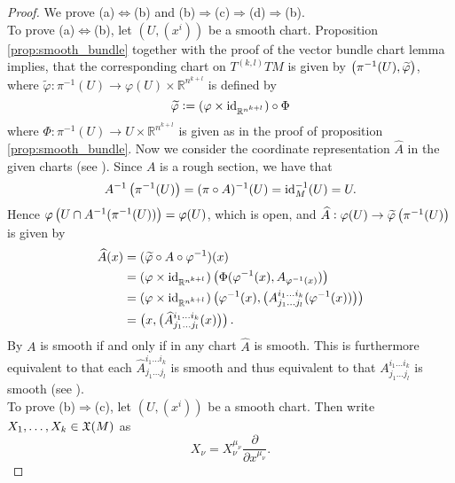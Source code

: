 \begin{appendix}
\begin{proof}
We prove (a)$\Leftrightarrow$(b) and (b)$\Rightarrow$(c)$\Rightarrow$(d)$\Rightarrow$(b).\\
To prove (a)$\Leftrightarrow$(b), let $(U,(x^i))$ be a smooth chart. Proposition \ref{prop:smooth_bundle} together with the proof of the vector bundle chart lemma \cite[253--254]{lee:smooth_manifolds:2013} implies, that the corresponding chart on $T^{(k,l)}TM$ is given by $\del[1]{\pi^{-1}(U),\widetilde{\varphi}}$, where $\widetilde{\varphi}: \pi^{-1}(U) \to \varphi(U) \times \mathbb{R}^{n^{k+l}}$ is defined by
\begin{equation*}
\widetilde{\varphi} := (\varphi \times \operatorname{id}_{\mathbb{R}^{n^{k+l}}}) \circ \Phi
\end{equation*}
\noindent where $\Phi : \pi^{-1}(U) \to U \times \mathbb{R}^{n^{k + l}}$ is given as in the proof of proposition \ref{prop:smooth_bundle}. Now we consider the coordinate representation $\widehat{A}$ in the given charts (see \cite[35]{lee:smooth_manifolds:2013}). Since $A$ is a rough section, we have that 
\begin{equation*}
A^{-1}\del[1]{\pi^{-1}(U)} = (\pi \circ A)^{-1}(U) = \id_M^{-1}(U) = U.
\end{equation*}
Hence $\varphi\del[1]{U \cap A^{-1}(\pi^{-1}(U))} = \varphi(U)$, which is open, and $\widehat{A}: \varphi(U) \to \widetilde{\varphi}\del[1]{\pi^{-1}(U)}$ is given by
\begin{align*}
\widehat{A}(x) &= (\widetilde{\varphi} \circ A \circ \varphi^{-1})(x)\\
&= (\varphi \times \id_{\mathbb{R}^{n^{k+l}}})\del[1]{\Phi(\varphi^{-1}(x),A_{\varphi^{-1}(x)})}\\
&= (\varphi \times \id_{\mathbb{R}^{n^{k+l}}})\del[1]{\varphi^{-1}(x),\del[1]{A^{i_1\dots i_k}_{j_1\dots j_l}(\varphi^{-1}(x))}}\\
&= \del[1]{x,\del[1]{\widehat{A}^{i_1\dots i_k}_{j_1\dots j_l}(x)}}.
\end{align*}
By \cite[35]{lee:smooth_manifolds:2013} $A$ is smooth if and only if in any chart $\widehat{A}$ is smooth. This is furthermore equivalent to that each $\widehat{A}^{i_1\dots i_k}_{j_1\dots j_l}$ is smooth and thus equivalent to that $A^{i_1\dots i_k}_{j_1\dots j_l}$ is smooth (see \cite[33]{lee:smooth_manifolds:2013}).\\
To prove (b)$\Rightarrow$(c), let $(U,(x^i))$ be a smooth chart. Then write $X_1,\dots,X_k \in \mathfrak{X}(M)$ as 
\begin{equation*}
X_\nu = X^{\mu_\nu}_\nu \frac{\partial}{\partial x^{\mu_\nu}}.

\end{equation*}
\end{proof}
\end{appendix}

